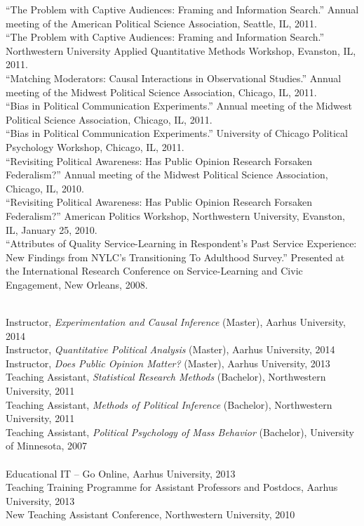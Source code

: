 \documentclass[12pt]{article}
\renewcommand{\section}[1]{\pagebreak[3]%
    \llap{\scshape\smash{\parbox[t]{\marginparwidth}{\raggedright {\color{lg}#1}}}}%
    \vspace{-\baselineskip}\par}
\newcommand{\topic}[1]{\pagebreak[3]\indent {\color{lg}{\footnotesize #1 }}\\}
\newcommand{\entry}[1]{\indent {\color{lg}\guillemotright}\hspace{2pt}#1\vspace{.25em}\\}
\begin{document}
\entry{``The Problem with Captive Audiences: Framing and Information Search.'' Annual meeting of the American Political Science Association, Seattle, IL, 2011.}
\entry{``The Problem with Captive Audiences: Framing and Information Search.'' Northwestern University Applied Quantitative Methods Workshop, Evanston, IL, 2011.}
\entry{``Matching Moderators: Causal Interactions in Observational Studies.'' Annual meeting of the Midwest Political Science Association, Chicago, IL, 2011.}
\entry{``Bias in Political Communication Experiments.'' Annual meeting of the Midwest Political Science Association, Chicago, IL, 2011.}
\entry{``Bias in Political Communication Experiments.'' University of Chicago Political Psychology Workshop, Chicago, IL, 2011.}
\entry{``Revisiting Political Awareness: Has Public Opinion Research Forsaken Federalism?'' Annual meeting of the Midwest Political Science Association, Chicago, IL, 2010.}
\entry{``Revisiting Political Awareness: Has Public Opinion Research Forsaken Federalism?'' American Politics Workshop, Northwestern University, Evanston, IL, January 25, 2010.}
\entry{``Attributes of Quality Service-Learning in Respondent's Past Service Experience: New Findings from NYLC's Transitioning To Adulthood Survey.'' Presented at the International Research Conference on Service-Learning and Civic Engagement, New Orleans, 2008.}


\section{Teaching}
\topic{Experience}
\entry{Instructor, {\em Experimentation and Causal Inference} (Master), Aarhus University, 2014}
\entry{Instructor, {\em Quantitative Political Analysis} (Master), Aarhus University, 2014}
\entry{Instructor, {\em Does Public Opinion Matter?} (Master), Aarhus University, 2013}
\entry{Teaching Assistant, {\em Statistical Research Methods} (Bachelor), Northwestern University, 2011} %
\entry{Teaching Assistant, {\em Methods of Political Inference} (Bachelor), Northwestern University, 2011} %
\entry{Teaching Assistant, {\em Political Psychology of Mass Behavior} (Bachelor), University of Minnesota, 2007} %

\topic{Training}
\entry{Educational IT -- Go Online, Aarhus University, 2013}
\entry{Teaching Training Programme for Assistant Professors and Postdocs, Aarhus University, 2013}
\entry{New Teaching Assistant Conference, Northwestern University, 2010}
\end{document}
